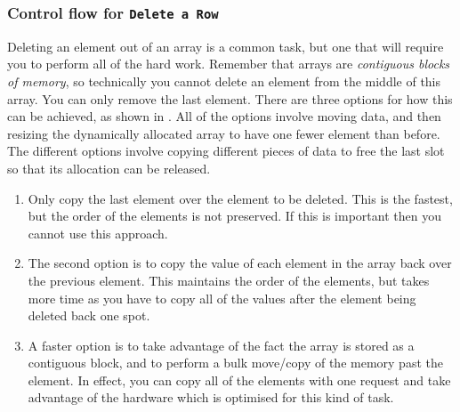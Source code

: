 
\subsubsection{Control flow for \texttt{Delete a Row}} %
\label{ssub:control_flow_for_}

Deleting an element out of an array is a common task, but one that will require you to perform all of the hard work. Remember that arrays are \emph{contiguous blocks of memory}, so technically you cannot delete an element from the middle of this array. You can only remove the last element. There are three options for how this can be achieved, as shown in . All of the options involve moving data, and then resizing the dynamically allocated array to have one fewer element than before. The different options involve copying different pieces of data to free the last slot so that its allocation can be released.

\begin{enumerate}
  \item Only copy the last element over the element to be deleted. This is the fastest, but the order of the elements is not preserved. If this is important then you cannot use this approach.
  \item The second option is to copy the value of each element in the array back over the previous element. This maintains the order of the elements, but takes more time as you have to copy all of the values after the element being deleted back one spot.
  \item A faster option is to take advantage of the fact the array is stored as a contiguous block, and to perform a bulk move/copy of the memory past the element. In effect, you can copy all of the elements with one request and take advantage of the hardware which is optimised for this kind of task.
\end{enumerate}

